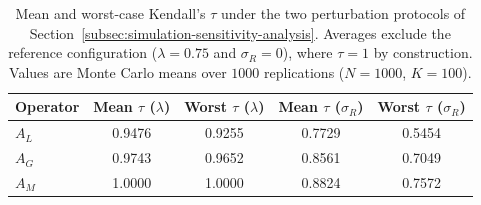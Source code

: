\begin{table}[H]
\caption{Mean and worst-case Kendall's $\tau$ under the two perturbation
protocols of Section~\ref{subsec:simulation-sensitivity-analysis}.
Averages exclude the reference configuration ($\lambda=0.75$ and
$\sigma_R=0$), where $\tau=1$ by construction. Values are Monte Carlo
means over $1000$ replications ($N=1000$, $K=100$).}
\label{tab:stability-summary}
\centering
\small
\renewcommand{\arraystretch}{1.2}
\begin{tabular}{lcccc}
\toprule
Operator & Mean $\tau$ ($\lambda$) & Worst $\tau$ ($\lambda$) & Mean $\tau$ ($\sigma_R$) & Worst $\tau$ ($\sigma_R$) \\
\midrule
$A_L$ & 0.9476 & 0.9255 & 0.7729 & 0.5454 \\
$A_G$ & 0.9743 & 0.9652 & 0.8561 & 0.7049 \\
$A_M$ & 1.0000 & 1.0000 & 0.8824 & 0.7572 \\
\bottomrule
\end{tabular}
\end{table}
